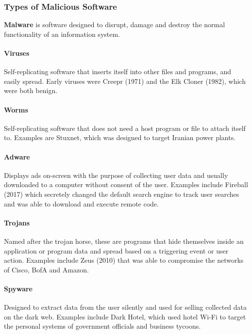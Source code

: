 \subsubsection{Types of Malicious Software}

\textbf{Malware} is software designed to disrupt, damage and destroy the normal functionality of an information system.

\paragraph{Viruses} Self-replicating software that inserts itself into other files and programs, and easily spread. Early viruses were Creepr (1971) and the Elk Cloner (1982), which were both benign.

\paragraph{Worms} Self-replicating software that does not need a host program or file to attach itself to. Examples are Stuxnet, which was designed to target Iranian power plants.

\paragraph{Adware} Displays ads on-screen with the purpose of collecting user data and usually downloaded to a computer without consent of the user. Examples include Fireball (2017) which secretely changed the default search engine to track user searches and was able to download and execute remote code.

\paragraph{Trojans} Named after the trojan horse, these are programs that hide themselves inside an application or program data and spread based on a triggering event or user action. Examples include Zeus (2010) that was able to compromise the networks of Cisco, BofA and Amazon.

\paragraph{Spyware} Designed to extract data from the user silently and used for selling collected data on the dark web. Examples include Dark Hotel, which used hotel Wi-Fi to target the personal systems of government officials and business tycoons.

